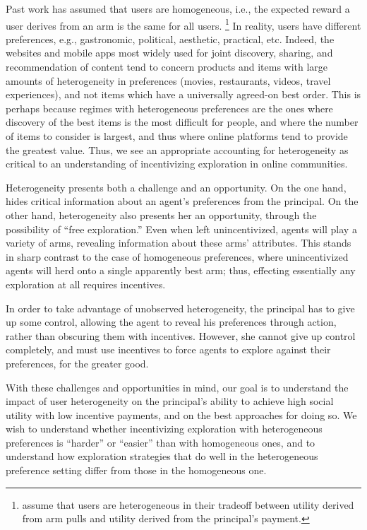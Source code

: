 Past work has assumed that users are homogeneous, i.e., the expected
reward a user derives from an arm is the same for all users.%
\footnote{\citet{han2015incentivizing} assume that users are
heterogeneous in their tradeoff between utility derived from arm pulls
and utility derived from the principal's payment.}
In reality, users have different preferences, e.g., gastronomic,
political, aesthetic, practical, etc.
Indeed, the websites and mobile apps most widely used for joint discovery,
sharing, and recommendation of content tend to concern products and items 
with large amounts of heterogeneity in preferences (movies, restaurants,
videos, travel experiences), and not items which have a universally
agreed-on best order.
This is perhaps because regimes with heterogeneous preferences are the
ones where discovery of the best items is the most difficult for people, and
where the number of items to consider is largest, and thus where online
platforms tend to provide the greatest value.  Thus, we see an appropriate
accounting for heterogeneity as critical to an understanding of incentivizing
exploration in online communities.

Heterogeneity presents both a challenge and an opportunity.
On the one hand,  hides critical
information about an agent's preferences from the principal.
On the other hand, heterogeneity also presents her an opportunity,
through the possibility of ``free exploration.''
Even when left unincentivized, agents will
play a variety of arms, revealing information about these arms' attributes.
This stands in sharp contrast to the case of homogeneous preferences,
where unincentivized agents will herd onto a single apparently best arm;
thus, effecting essentially any exploration at all requires incentives.

In order to take advantage of unobserved heterogeneity,
the principal has to give up some control, allowing the agent to
reveal his preferences through action, rather than obscuring them with
incentives.
However, she cannot give up control completely,
and must use incentives to force agents to explore against their
preferences, for the greater good. 

With these challenges and opportunities in mind, our goal is to understand the
impact of user heterogeneity on the principal's ability to achieve
high social utility with low incentive payments,
and on the best approaches for doing so.
We wish to understand whether incentivizing exploration with
heterogeneous preferences  is ``harder'' or ``easier'' than with
homogeneous ones,
and to understand how exploration strategies that do well in the
heterogeneous preference setting differ from those in the homogeneous one.

